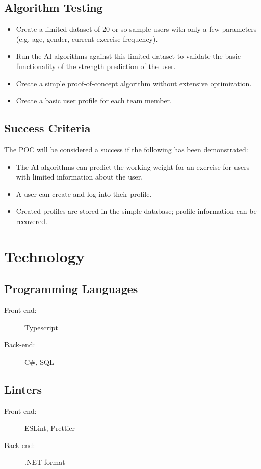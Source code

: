 \documentclass{article}
\begin{document}
	\subsection{Algorithm Testing}
	\begin{itemize}
		\item Create a limited dataset of 20 or so sample users with only a few parameters (e.g. age, gender, current exercise frequency).
		\item Run the AI algorithms against this limited dataset to validate the basic functionality of the strength prediction of the user.
		\item Create a simple proof-of-concept algorithm without extensive optimization.
		\item Create a basic user profile for each team member.
	\end{itemize}

	\subsection{Success Criteria}
	The POC will be considered a success if the following has been demonstrated:
	\begin{itemize}
		\item The AI algorithms can predict the working weight for an exercise for users with limited information about the user.
		\item A user can create and log into their profile.
		\item Created profiles are stored in the simple database; profile information can be recovered.
	\end{itemize}

	\section{Technology}

	\subsection{Programming Languages}
	\begin{description}
		\item[Front-end:] Typescript
		\item[Back-end:] C\#, SQL
	\end{description}

	\subsection{Linters}
	\begin{description}
		\item[Front-end:] ESLint, Prettier
		\item[Back-end:] .NET format
	\end{description}
\end{document}
